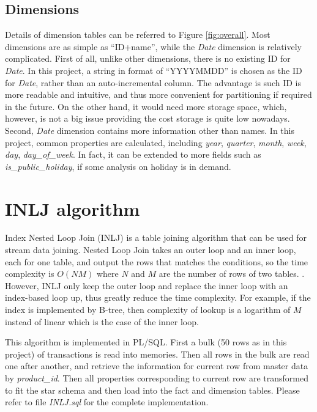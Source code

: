 \documentclass[
  12pt,
  a4paper,
]{article}
\begin{document}
\hypertarget{dimensions}{%
\subsection{Dimensions}\label{dimensions}}

Details of dimension tables can be referred to Figure \ref{fig:overall}.
Most dimensions are as simple as ``ID+name'', while the \emph{Date}
dimension is relatively complicated. First of all, unlike other
dimensions, there is no existing ID for \emph{Date}. In this project, a
string in format of ``YYYYMMDD'' is chosen as the ID for \emph{Date},
rather than an auto-incremental column. The advantage is such ID is more
readable and intuitive, and thus more convenient for partitioning if
required in the future. On the other hand, it would need more storage
space, which, however, is not a big issue providing the cost storage is
quite low nowadays. Second, \emph{Date} dimension contains more
information other than names. In this project, common properties are
calculated, including \emph{year}, \emph{quarter}, \emph{month},
\emph{week}, \emph{day}, \emph{day\_of\_week}. In fact, it can be
extended to more fields such as \emph{is\_public\_holiday}, if some
analysis on holiday is in demand.

\hypertarget{inlj-algorithm}{%
\section{INLJ algorithm}\label{inlj-algorithm}}

Index Nested Loop Join (INLJ) is a table joining algorithm that can be
used for stream data joining. Nested Loop Join takes an outer loop and
an inner loop, each for one table, and output the rows that matches the
conditions, so the time complexity is \(O(N M)\) where \(N\) and \(M\)
are the number of rows of two tables. . However, INLJ only keep the
outer loop and replace the inner loop with an index-based loop up, thus
greatly reduce the time complexity. For example, if the index is
implemented by B-tree, then complexity of lookup is a logarithm of \(M\)
instead of linear which is the case of the inner loop.

This algorithm is implemented in PL/SQL. First a bulk (50 rows as in
this project) of transactions is read into memories. Then all rows in
the bulk are read one after another, and retrieve the information for
current row from master data by \emph{product\_id}. Then all properties
corresponding to current row are transformed to fit the star schema and
then load into the fact and dimension tables. Please refer to file
\emph{INLJ.sql} for the complete implementation.
\end{document}
